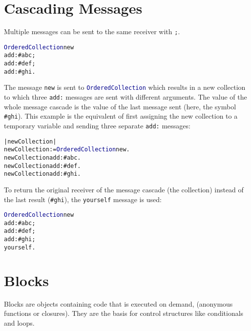 \section{Cascading Messages}

Multiple messages can be sent to the same receiver with \texttt{;}.

\begin{alltt}
\textcolor{darkBlue}{OrderedCollection} new
  add: \textcolor{string}{#abc};
  add: \textcolor{string}{#def};
  add: \textcolor{string}{#ghi}.
\end{alltt}

The message \texttt{new} is sent to \texttt{\textcolor{darkBlue}{OrderedCollection}} which
results in a new collection to which three \texttt{add:} messages are sent with different arguments.
The value of the whole message cascade is the value of the last message sent (here, the symbol \textcolor{string}{\texttt{\#ghi}}).
This example is the equivalent of first assigning the new collection to a temporary variable and sending three separate \texttt{add:} messages:

\begin{alltt}
| newCollection | 
newCollection := \textcolor{darkBlue}{OrderedCollection} new.
newCollection add: \textcolor{string}{#abc}.
newCollection add: \textcolor{string}{#def}.
newCollection add: \textcolor{string}{#ghi}.
\end{alltt}


To return the original receiver of the message cascade (\ie the collection) instead of the last result (\ie \textcolor{string}{\texttt{\#ghi}}), the \texttt{yourself} message is used:

\begin{alltt}
\textcolor{darkBlue}{OrderedCollection} new
  add: \textcolor{string}{#abc};
  add: \textcolor{string}{#def};
  add: \textcolor{string}{#ghi};
  yourself.
\end{alltt}

\section{Blocks}

Blocks are objects containing code that is executed on demand,
(anonymous functions or closures).
They are the basis for control structures like conditionals and loops.

